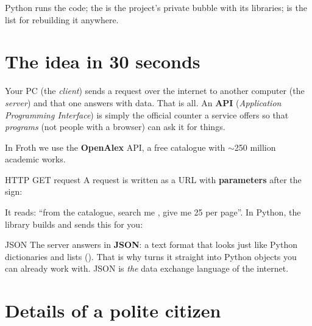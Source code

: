 \documentclass[11pt,a4paper]{article}
\begin{document}
\begin{resumen}
Python runs the code; the  is the project's private bubble with its libraries;
 is the list for rebuilding it anywhere.
\end{resumen}
\clearpage
{}
{}

\section{The idea in 30 seconds}

Your PC (the \emph{client}) sends a request over the internet to another computer (the
\emph{server}) and that one answers with data. That is all. An \textbf{API}
(\emph{Application Programming Interface}) is simply the official counter a service offers
so that \emph{programs} (not people with a browser) can ask it for things.

In Froth we use the \textbf{OpenAlex} API, a free catalogue with $\sim$250 million academic
works.

\begin{concepto}{HTTP GET request}
A request is written as a URL with \textbf{parameters} after the  sign:
\begin{center}
\small{}
\end{center}
It reads: ``from the  catalogue, search me , give
me 25 per page''. In Python, the  library builds and sends this for you:
\begin{center}
\end{center}
\end{concepto}

\begin{concepto}{JSON}
The server answers in \textbf{JSON}: a text format that looks just like Python dictionaries
and lists (). That is why  turns it
straight into Python objects you can already work with. JSON is \emph{the} data exchange
language of the internet.
\end{concepto}

\section{Details of a polite citizen}
\end{document}
